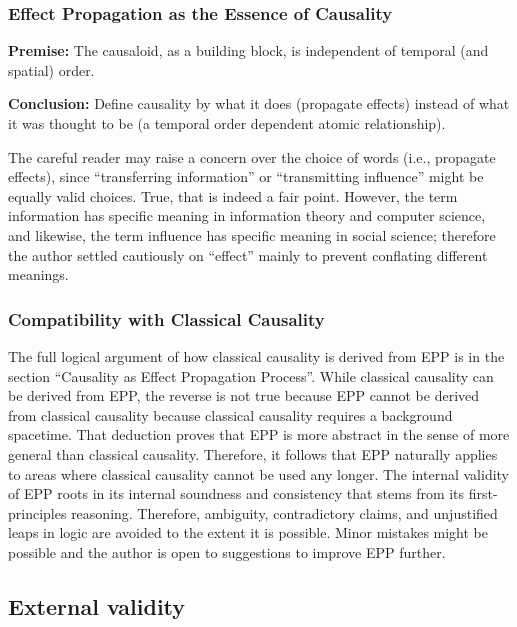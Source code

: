 \documentclass{article}
\begin{document}
\subsubsection{Effect Propagation as the Essence of Causality}

\textbf{Premise:} The causaloid, as a building block, is independent of temporal (and spatial) order.

\textbf{Conclusion:} Define causality by what it does (propagate effects) instead of what it was thought to be (a temporal order dependent atomic relationship).

The careful reader may raise a concern over the choice of words (i.e., propagate effects), since “transferring information” or “transmitting influence” might be equally valid choices. True, that is indeed a fair point. However, the term information has specific meaning in information theory and computer science, and likewise, the term influence has specific meaning in social science; therefore the author settled cautiously on “effect” mainly to prevent conflating different meanings.

\subsubsection{Compatibility with Classical Causality}

The full logical argument of how classical causality is derived from EPP is in the section “Causality as Effect Propagation Process”.
While classical causality can be derived from EPP, the reverse is not true because EPP cannot be derived from classical causality because classical causality requires a background spacetime. That deduction proves that EPP is more abstract in the sense of more general than classical causality. Therefore, it follows that EPP naturally applies to areas where classical causality cannot be used any longer. The internal validity of EPP roots in its internal soundness and consistency that stems from its first-principles reasoning. Therefore, ambiguity, contradictory claims, and unjustified leaps in logic are avoided to the extent it is possible. Minor mistakes might be possible and the author is open to suggestions  to improve EPP further.

\newpage

\subsection{External validity}
\label{sec:validity_external}
\end{document}
